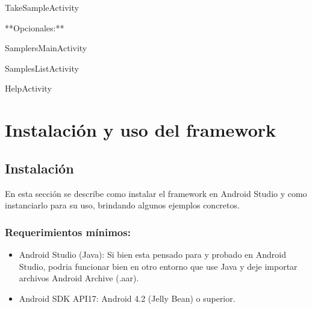 TakeSampleActivity

**Opcionales:**

SamplersMainActivity

SamplesListActivity

HelpActivity


\section{Instalación y uso del framework}
\subsection{Instalación}
En esta sección se describe como instalar el framework en Android Studio y como instanciarlo para su uso, brindando algunos ejemplos concretos.

\subsubsection{Requerimientos mínimos:}

\begin{itemize}
\item Android Studio (Java): Si bien esta pensado para y probado en Android Studio, podria funcionar bien en otro entorno que use Java y deje importar archivos Android Archive (.aar).
\item Android SDK API17: Android 4.2 (Jelly Bean) o superior.
\end{itemize}

